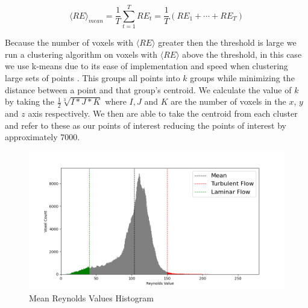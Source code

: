 \begin{equation} \label{eq:2}
\langle RE\rangle_{mean} = \frac{1}{T} \sum_{t=1}^{T} RE_{t}=\frac{1}{T}\left(RE_{1}+\cdots+RE_{T}\right)
\end{equation} 

Because the number of voxels with \ensuremath{\langle RE\rangle} greater then the threshold is large we run a clustering algorithm on voxels with \ensuremath{\langle RE\rangle} above the threshold, in this case we use k-means due to its ease of implementation and speed when clustering large sets of points \cite{HDBScan}. This groups all points into \ensuremath{k} groups while minimizing the distance between a point and that group's centroid. We calculate the value of \ensuremath{k} by taking the \ensuremath{\frac{1}{2}\sqrt[3]{I*J*K}} where \ensuremath{I,J} and \ensuremath{K} are the number of voxels in the \ensuremath{x}, \ensuremath{y} and \ensuremath{z} axis respectively. We then are able to take the centroid from each cluster and  refer to these as our points of interest reducing the points of interest by approximately 7000. 


\begin{figure}
\centering
\includegraphics[scale=.35]{Figures/Hist4_11.png}
\decoRule
\caption[Reynolds Number Histogram]{Mean Reynolds Values Histogram}
\label{fig:MHistgram}
\end{figure}

